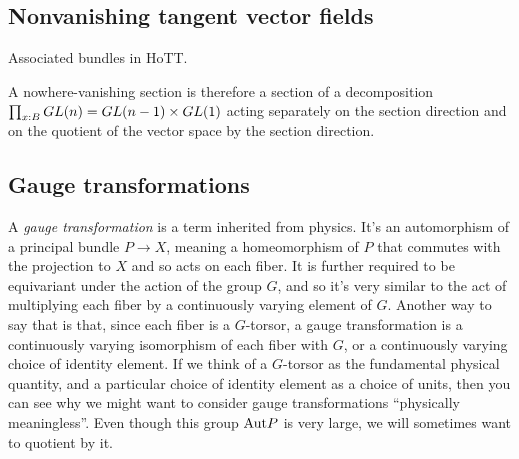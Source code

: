 \documentclass[12pt]{article}
\begin{document}

\subsection{Nonvanishing tangent vector fields}

Associated bundles in HoTT.

A nowhere-vanishing section is therefore a section of a decomposition \( \prod_{x:B}GL(n)=GL(n-1)\times GL(1) \) acting separately on the section direction and on the quotient of the vector space by the section direction.

\subsection{Gauge transformations}

A \emph{gauge transformation} is a term inherited from physics. It's an automorphism of a principal bundle \( P\to X \), meaning a homeomorphism of \( P \) that commutes with the projection to \( X \) and so acts on each fiber. It is further required to be equivariant under the action of the group \( G \), and so it's very similar to the act of multiplying each fiber by a continuously varying element of \( G \). Another way to say that is that, since each fiber is a \( G \)-torsor, a gauge transformation is a continuously varying isomorphism of each fiber with \( G \), or a continuously varying choice of identity element. If we think of a \( G \)-torsor as the fundamental physical quantity, and a particular choice of identity element as a choice of units, then you can see why we might want to consider gauge transformations ``physically meaningless''. Even though this group \( \mathrm{Aut} P \) is very large, we will sometimes want to quotient by it.
\end{document}
